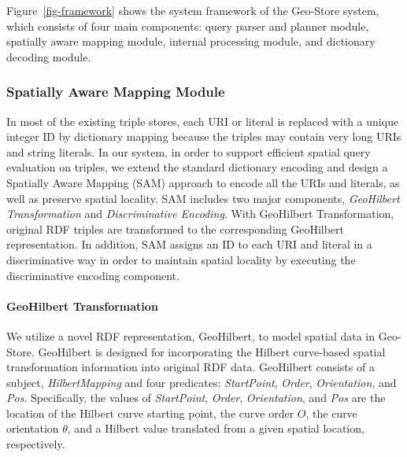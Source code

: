 Figure~\ref{fig-framework} shows the system framework of the
Geo-Store system, which consists of four main components: query
parser and planner module, spatially aware mapping module,
internal processing module, and dictionary decoding module.

\begin{figure*}[!h]
\begin{center}
\centerline{}
\caption{Geo-Store system architecture and use cases.}
\label{fig-framework} \vspace*{-10pt}
\end{center}
\end{figure*}


\subsubsection{Spatially Aware Mapping Module}

In most of the existing triple stores, each URI or literal is
replaced with a unique integer ID by dictionary mapping because
the triples may contain very long URIs and string literals. In our
system, in order to support efficient spatial query evaluation on
triples, we extend the standard dictionary encoding and design a
Spatially Aware Mapping (SAM) approach to encode all the URIs and
literals, as well as preserve spatial locality. SAM includes two
major components, \emph{GeoHilbert Transformation} and
\emph{Discriminative Encoding}. With GeoHilbert Transformation,
original RDF triples are transformed to the corresponding
GeoHilbert representation. In addition, SAM assigns an ID to each
URI and literal in a discriminative way in order to maintain
spatial locality by executing the discriminative encoding
component.


\paragraph{GeoHilbert Transformation}

We utilize a novel RDF representation, GeoHilbert, to model
spatial data in Geo-Store. GeoHilbert is designed for
incorporating the Hilbert curve-based spatial transformation
information into original RDF data. GeoHilbert consists of a
subject, \emph{HilbertMapping} and four predicates:
\emph{StartPoint}, \emph{Order}, \emph{Orientation}, and
\emph{Pos}. Specifically, the values of \emph{StartPoint},
\emph{Order}, \emph{Orientation}, and \emph{Pos} are the location
of the Hilbert curve starting point, the curve order $O$, the
curve orientation $\theta$, and a Hilbert value translated from a
given spatial location, respectively.


